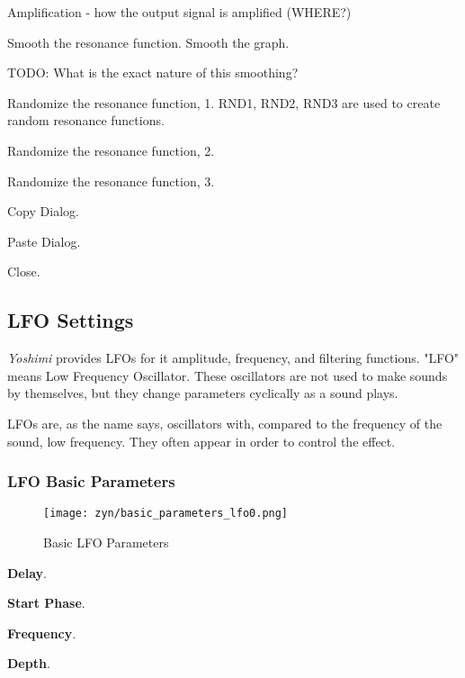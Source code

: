    Amplification - how the output signal is amplified (WHERE?)

   Smooth the resonance function.
   Smooth the graph.

   TODO:  What is the exact nature of this smoothing?

   Randomize the resonance function, 1.
   RND1, RND2, RND3 are used to create random resonance functions.

   Randomize the resonance function, 2.

   Randomize the resonance function, 3.

   Copy Dialog.

   Paste Dialog.

   Close.

\subsection{LFO Settings}
\label{subsec:lfo_settings}

   \textsl{Yoshimi} provides LFOs for it amplitude, frequency, and filtering
   functions.
   "LFO" means Low Frequency Oscillator. These oscillators are not used to make
   sounds by themselves, but they change parameters cyclically as a sound
   plays.

   LFOs are, as the name says, oscillators with, compared to the frequency of
   the sound, low frequency. They often appear in order to control the
   effect.

\subsubsection{LFO Basic Parameters}
\label{subsubsec:lfo_basic_parameters}

\begin{figure}[H]
   \centering 
   \texttt{[image: zyn/basic\_parameters\_lfo0.png]}
   \caption[Basic LFO Parameters]{Basic LFO Parameters}
   \label{fig:basic_parameters_lfo} 
\end{figure}

   \begin{enumber}
      \item \textbf{Delay}.
      \item \textbf{Start Phase}.
      \item \textbf{Frequency}.
      \item \textbf{Depth}.
   \end{enumber}

